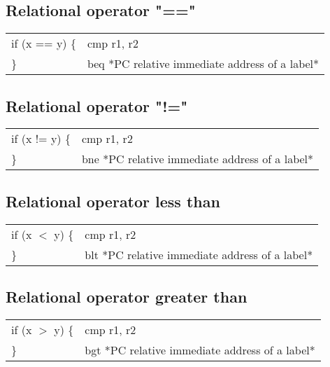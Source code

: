 \documentclass{article}
\begin{document}
\begin{par}
	\subsection{Relational operator "=="}
	\begin{center}
		\begin{tabular}{|l|l|}
			\hline
			if (x == y) \{ & cmp r1, r2 \\
			\} & beq *PC relative immediate address of a label* \\
			\hline
		\end{tabular}
	\end{center}

	\subsection{Relational operator "!="}
	\begin{center}
		\begin{tabular}{|l|l|}
			\hline
			if (x != y) \{ & cmp r1, r2 \\
			\} & bne *PC relative immediate address of a label* \\
			\hline
		\end{tabular}
	\end{center}

	\subsection{Relational operator less than}
	\begin{center}
		\begin{tabular}{|l|l|}
			\hline
			if (x $ < $ y) \{ & cmp r1, r2 \\
			\} & blt *PC relative immediate address of a label* \\
			\hline
		\end{tabular}
	\end{center}

	\subsection{Relational operator greater than}
	\begin{center}
		\begin{tabular}{|l|l|}
			\hline
			if (x $ > $ y) \{ & cmp r1, r2 \\
			\} & bgt *PC relative immediate address of a label* \\
			\hline
		\end{tabular}
	\end{center}


\end{par}
\end{document}
